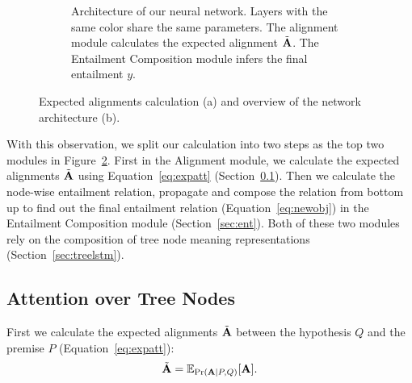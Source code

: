 \begin{figure}
\begin{subfigure}[t]{0.48\textwidth}
\caption{Architecture of our neural network.
Layers with the same color share the same parameters.
The alignment module
calculates the expected alignment $\tilde{\mathbf{A}}$.
The Entailment Composition module
infers the final entailment $y$.%
\label{fig:arch}}
\end{subfigure}
\vspace{-0.2cm}
\caption{Expected alignments calculation (a) and overview of the network architecture (b).}
\vspace{-0.5cm}
\end{figure}

With this observation, we split our calculation into two steps
as the top two modules in Figure~\ref{fig:arch}.
First in the Alignment module,
we calculate the expected alignments 
$\tilde{\mathbf{A}}$ using Equation~\ref{eq:expatt} 
(Section~\ref{sec:att}).
Then we calculate the node-wise
entailment relation, propagate and compose the relation from
bottom up to find out the final entailment relation 
(Equation~\ref{eq:newobj})
in the Entailment Composition module
(Section~\ref{sec:ent}).
Both of these two modules rely on the composition of tree node meaning
representations (Section~\ref{sec:treelstm}).

\subsection{Attention over Tree Nodes}
\label{sec:att}
First we calculate the expected alignments
 $\tilde{\mathbf{A}}$ between the hypothesis $Q$ and the premise $P$ (Equation~\ref{eq:expatt}):
\[\tilde{\mathbf{A}} = \mathbb{E}_{\mathrm{Pr}(\mathbf{A}|P, Q)}[\mathbf{A}].\]

